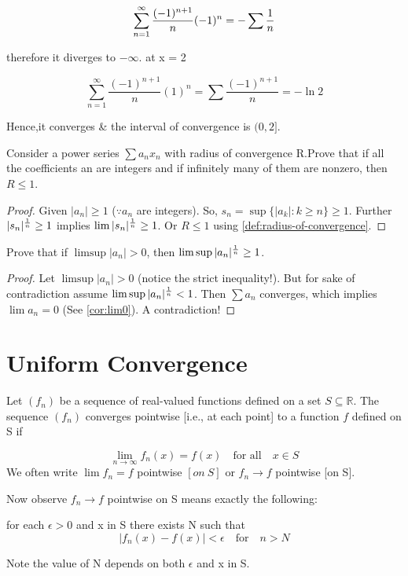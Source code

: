 \documentclass{notes}
\begin{document}
$$ \sum_{n=1}^{\infty} \frac{(-1)^{n+1}}{n}(-1)^n = - \sum {1 \over n}$$

therefore it diverges to $- \infty$.
at x = 2

$$ \sum_{n=1}^{\infty} \frac{(-1)^{n+1}}{n}(1)^n = \sum \frac{(-1)^{n+1}}{n} = - \ln2$$


Hence,it converges \& the 
interval of convergence is $(0,2]$.
\begin{problem}
	Consider a power series $\sum a_n x_n$ with radius of convergence R.Prove that if all the coefficients an are integers and if infinitely
	many of them are nonzero, then $R \leq 1$.
\end{problem}
\begin{proof}
Given $|a_n| \geq 1$ ($\because a_n$ are integers). So, $s_n = \sup \{|a_k|: k \geq n\} \geq 1$. Further $|s_n|^{1 \over n} \geq 1$ implies $\lim |s_n|^{1 \over n} \geq 1$. Or $R \leq 1$ using \ref{def:radius-of-convergence}.
\end{proof}
\begin{problem}
Prove that if $\limsup |a_n| > 0$, then $\limsup |a_n|^{1\over n} \geq 1$.
\end{problem}
\begin{proof}
	Let $\limsup |a_n| > 0$ (notice the strict inequality!). But for sake of contradiction assume $\limsup |a_n|^{1\over n} < 1$. Then $\sum a_n$ converges, which implies $\lim a_n = 0$ (See \ref{cor:lim0}). A contradiction!
\end{proof}
\section{Uniform Convergence}

\begin{definition}{}
	Let $(f_n)$ be a sequence of real-valued functions defined on a set $S \subseteq \mathbb{R}$. The sequence $(f_n)$ converges pointwise [i.e., at each point] to a
	function $f$ defined on S if
	
	$$ \lim\limits_{n\to \infty} f_n (x) = f(x) \quad \text{for all} \quad x\in S$$
	We often write $\lim f_n = f$ pointwise $[on\ S]$ or $f_n \to f$ pointwise [on S].
	
	
	Now observe $f_n\to f$ pointwise on S means exactly the following:
	
	for each $\epsilon>0$ and x in S there exists N such that
	$$ |f_n(x) - f(x)| < \epsilon\quad \text{for}\quad n>N$$
	
	Note the value of N depends on both $\epsilon$ and x in S. 
\end{definition}
\end{document}
